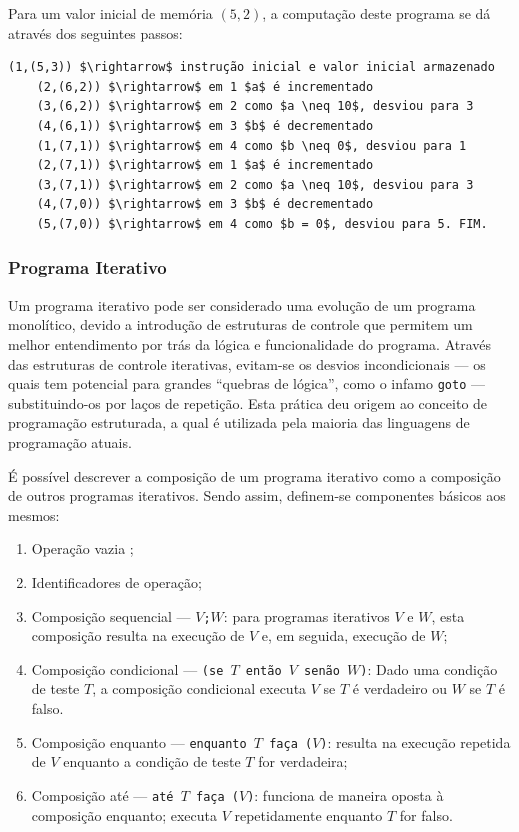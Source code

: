 \documentclass[12pt,fleqn]{article}
\begin{document}
\noindent
Para um valor inicial de memória $(5,2)$, a computação deste programa se dá
através dos seguintes passos:

\begin{Verbatim}[commandchars=\\\{\},codes={\catcode`\$=3\catcode`\^=7}]
    (1,(5,3)) $\rightarrow$ instrução inicial e valor inicial armazenado
    (2,(6,2)) $\rightarrow$ em 1 $a$ é incrementado
    (3,(6,2)) $\rightarrow$ em 2 como $a \neq 10$, desviou para 3
    (4,(6,1)) $\rightarrow$ em 3 $b$ é decrementado
    (1,(7,1)) $\rightarrow$ em 4 como $b \neq 0$, desviou para 1
    (2,(7,1)) $\rightarrow$ em 1 $a$ é incrementado
    (3,(7,1)) $\rightarrow$ em 2 como $a \neq 10$, desviou para 3
    (4,(7,0)) $\rightarrow$ em 3 $b$ é decrementado
    (5,(7,0)) $\rightarrow$ em 4 como $b = 0$, desviou para 5. FIM.
\end{Verbatim}


\subsubsection{Programa Iterativo}
Um programa iterativo pode ser considerado uma evolução de um programa
monolítico, devido a introdução de estruturas de controle que permitem um
melhor entendimento por trás da lógica e funcionalidade do programa. Através
das estruturas de controle iterativas, evitam-se os desvios incondicionais ---
os quais tem potencial para grandes ``quebras de lógica'', como o infamo
\verb|goto| --- substituindo-os por laços de repetição. Esta prática deu origem
ao conceito de programação estruturada, a qual é utilizada pela maioria das
linguagens de programação atuais.

É possível descrever a composição de um programa iterativo como a composição de
outros programas iterativos. Sendo assim, definem-se componentes básicos aos
mesmos:

\begin{enumerate}
    \item Operação vazia \checkmark;
    \item Identificadores de operação;
    \item Composição sequencial --- \texttt{$V$;$W$}: para programas iterativos
    $V$ e $W$, esta composição resulta na execução de $V$ e, em seguida,
    execução de $W$;
    \item Composição condicional --- \texttt{(se $T$ então $V$ senão $W$)}:
    Dado uma condição de teste $T$, a composição condicional executa $V$ se $T$
    é verdadeiro ou $W$ se $T$ é falso.
    \item Composição enquanto --- \texttt{enquanto $T$ faça  ($V$)}: resulta na
    execução repetida de $V$ enquanto a condição de teste $T$ for verdadeira;
    \item Composição até --- \texttt{até $T$ faça ($V$)}: funciona de maneira
    oposta à composição enquanto; executa $V$ repetidamente enquanto $T$ for
    falso.
\end{enumerate}
\end{document}
